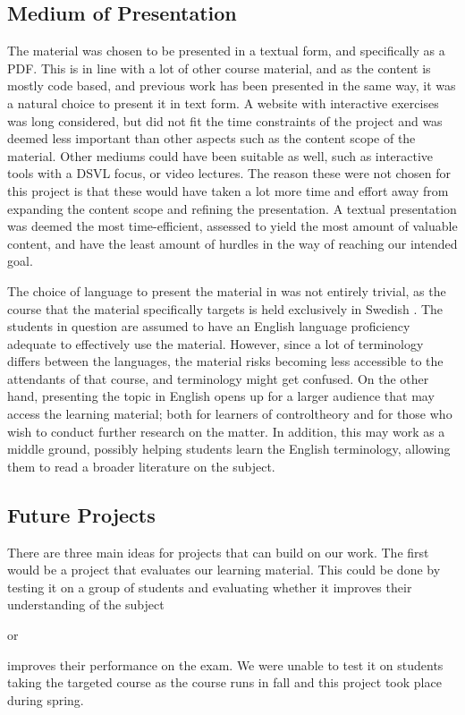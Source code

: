 \subsection{Medium of Presentation}%
The material was chosen to be presented in a textual form, and specifically as a PDF. This is in line with a lot of other course material, and as the content is mostly code based, and previous work has been presented in the same way, it was a natural choice to present it in text form. A website with interactive exercises was long considered, but did not fit the time constraints of the project and was deemed less important than other aspects such as the content scope of the material. Other mediums could have been suitable as well, such as interactive tools with a \gls{DSVL} focus, or video lectures. The reason these were not chosen for this project is that these would have taken a lot more time and effort away from expanding the content scope and refining the presentation. A textual presentation was deemed the most time-efficient, assessed to yield the most amount of valuable content, and have the least amount of hurdles in the way of reaching our intended goal.

The choice of language to present the material in was not entirely trivial, as the course that the material specifically targets is held exclusively in Swedish \cite{ERE103}. The students in question are assumed to have an English language proficiency adequate to effectively use the material. However, since a lot of terminology differs between the languages, the material risks becoming less accessible to the attendants of that course, and terminology might get confused. On the other hand, presenting the topic in English opens up for a larger audience that may access the learning material; both for learners of \gls{controltheory} and for those who wish to conduct further research on the matter. 
In addition, this may work as a middle ground, possibly helping students learn the English terminology, allowing them to read a broader literature on the subject.
 


\subsection{Future Projects}
There are three main ideas for projects that can build on our work. The first would be a project that evaluates our learning material. This could be done by testing it on a group of students and evaluating whether it improves their understanding of the subject \begin{modtext}or \end{modtext} improves their performance on the exam. We were unable to test it on students taking the targeted course as the course runs in fall and this project took place during spring.

